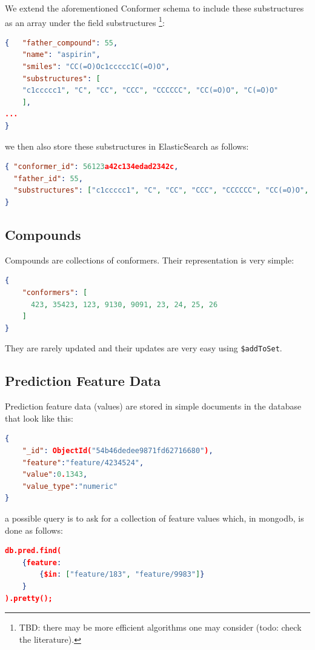 We extend the aforementioned Conformer schema to include 
these substructures as an array under the field substructures%
\footnote{TBD: there may be more efficient algorithms one may consider (todo: check the literature).}:
\begin{lstlisting}[language=json]
{   "father_compound": 55, 
    "name": "aspirin", 
    "smiles": "CC(=O)Oc1ccccc1C(=O)O",
    "substructures": [ 
	"c1ccccc1", "C", "CC", "CCC", "CCCCCC", "CC(=O)O", "C(=O)O" 
    ],
...
}
\end{lstlisting}

we then also store these substructures in ElasticSearch as follows:
\begin{lstlisting}[language=json]
{ "conformer_id": 56123a42c134edad2342c, 
  "father_id": 55,
  "substructures": ["c1ccccc1", "C", "CC", "CCC", "CCCCCC", "CC(=O)O", "C(=O)O"]
}
\end{lstlisting}

\subsection{Compounds}
Compounds are collections of conformers. Their representation is very simple:
\begin{lstlisting}[language=json]
{ 
    "conformers": [   
      423, 35423, 123, 9130, 9091, 23, 24, 25, 26 
    ]
}
\end{lstlisting}

They are rarely updated and their updates are very easy using \texttt{\$addToSet}.

\subsection{Prediction Feature Data}
Prediction feature data (values) are stored in simple 
documents in the database that look like this:

\begin{lstlisting}[language=json]
{ 
    "_id": ObjectId("54b46dedee9871fd62716680"),
    "feature":"feature/4234524", 
    "value":0.1343,
    "value_type":"numeric"
} 
\end{lstlisting}

a possible query is to ask for a collection of feature values which, in mongodb, is done as follows:
\begin{lstlisting}[language=json]
db.pred.find( 
    {feature:  
        {$in: ["feature/183", "feature/9983"]} 
    } 
).pretty(); 
\end{lstlisting}

